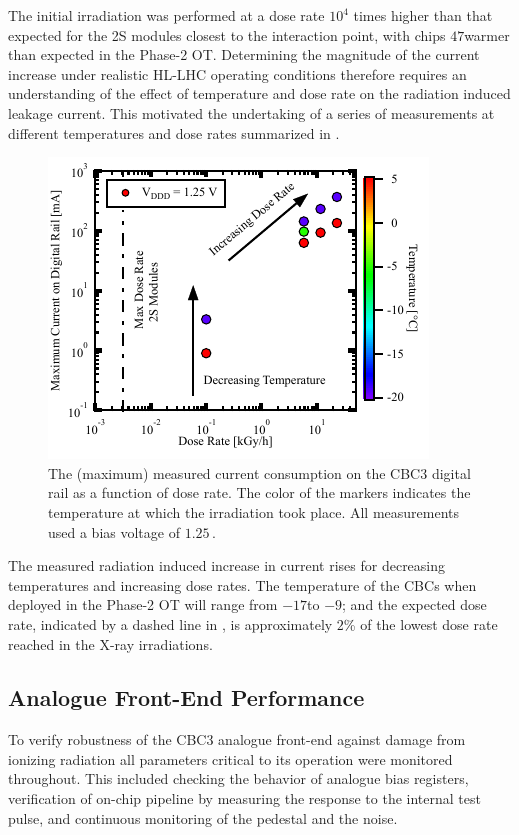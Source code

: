 The initial irradiation was performed at a dose rate ${10^{4}}$ times higher than that expected for the 2S modules closest to the interaction point, with chips ${47}$\deg warmer than expected in the Phase-2 OT. Determining the magnitude of the current increase under realistic HL-LHC operating conditions therefore requires an understanding of the effect of temperature and dose rate on the radiation induced leakage current. This motivated the undertaking of a series of measurements at different temperatures and dose rates summarized in .
\begin{figure}[!htbp]
\centering
\includegraphics[width=0.8\linewidth]{Figures/DigiCurrent_CBC3_Summary_v2.pdf}
\vspace*{-5mm}
\caption{The (maximum) measured current consumption on the CBC3 digital rail as a function of dose rate. The color of the markers indicates the temperature at which the irradiation took place. All measurements used a bias voltage of $1.25$\,\volt.}
\label{fig:DigiCurrentSummary}
\end{figure}

The measured radiation induced increase in current rises for decreasing temperatures and increasing dose rates. The temperature of the CBCs when deployed in the Phase-2 OT will range from ${-17}$\deg to ${-9}$\deg; and the expected dose rate, indicated by a dashed line in , is approximately $2$\% of the lowest dose rate reached in the X-ray irradiations. 

\subsection{Analogue Front-End Performance}
To verify robustness of the CBC3 analogue front-end against damage from ionizing radiation all parameters critical to its operation were monitored throughout. This included checking the behavior of  analogue bias registers, verification of  on-chip pipeline by measuring the response to the internal test pulse, and continuous monitoring of the pedestal and the noise.

